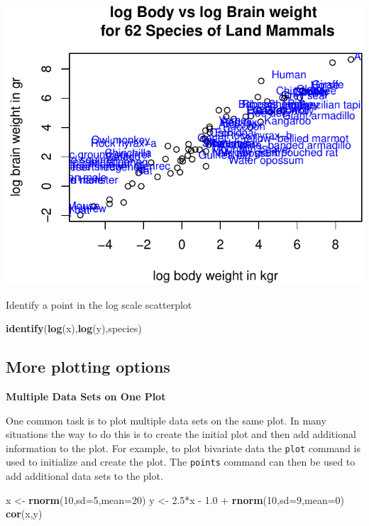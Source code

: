 \documentclass[]{article}
\newenvironment{Shaded}{\begin{snugshade}}{\end{snugshade}}
\newcommand{\KeywordTok}[1]{\textcolor[rgb]{0.13,0.29,0.53}{\textbf{{#1}}}}
\newcommand{\DataTypeTok}[1]{\textcolor[rgb]{0.13,0.29,0.53}{{#1}}}
\newcommand{\DecValTok}[1]{\textcolor[rgb]{0.00,0.00,0.81}{{#1}}}
\newcommand{\FloatTok}[1]{\textcolor[rgb]{0.00,0.00,0.81}{{#1}}}
\newcommand{\StringTok}[1]{\textcolor[rgb]{0.31,0.60,0.02}{{#1}}}
\newcommand{\NormalTok}[1]{{#1}}
\numberwithin{equation}{section}
\begin{document}
\begin{center}\includegraphics{index_files/figure-latex/unnamed-chunk-76-1} \end{center}

Identify a point in the log scale scatterplot

\begin{Shaded}
\begin{Highlighting}[]
\KeywordTok{identify}\NormalTok{(}\KeywordTok{log}\NormalTok{(x),}\KeywordTok{log}\NormalTok{(y),species)}
\end{Highlighting}
\end{Shaded}

\subsection{More plotting options}\label{more-plotting-options}

\textbf{Multiple Data Sets on One Plot}

One common task is to plot multiple data sets on the same plot. In many
situations the way to do this is to create the initial plot and then add
additional information to the plot. For example, to plot bivariate data
the \texttt{plot} command is used to initialize and create the plot. The
\texttt{points} command can then be used to add additional data sets to
the plot.

\begin{Shaded}
\begin{Highlighting}[]
 \NormalTok{x <-}\StringTok{ }\KeywordTok{rnorm}\NormalTok{(}\DecValTok{10}\NormalTok{,}\DataTypeTok{sd=}\DecValTok{5}\NormalTok{,}\DataTypeTok{mean=}\DecValTok{20}\NormalTok{)}
 \NormalTok{y <-}\StringTok{ }\FloatTok{2.5}\NormalTok{*x -}\StringTok{ }\FloatTok{1.0} \NormalTok{+}\StringTok{ }\KeywordTok{rnorm}\NormalTok{(}\DecValTok{10}\NormalTok{,}\DataTypeTok{sd=}\DecValTok{9}\NormalTok{,}\DataTypeTok{mean=}\DecValTok{0}\NormalTok{)}
 \KeywordTok{cor}\NormalTok{(x,y)}
\end{Highlighting}
\end{Shaded}
\end{document}
